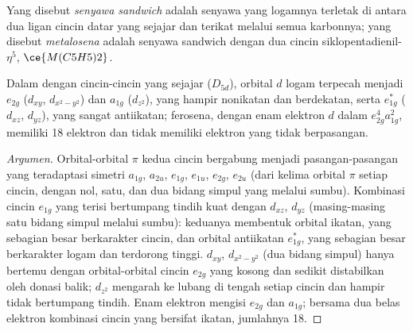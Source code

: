 \begin{definition}[Metalosena]\label{def:b3:organometallic-bonding:metallocene}
Yang disebut \emph{senyawa sandwich} adalah senyawa yang logamnya
terletak di antara dua ligan cincin datar yang sejajar dan terikat melalui semua karbonnya; yang
disebut \emph{metalosena} adalah senyawa sandwich dengan dua cincin
siklopentadienil-$\eta^5$, $\ce{M(C5H5)2}$.
\end{definition}

\begin{proposition}\label{prop:b3:organometallic-bonding:ferrocene}
Dalam  dengan cincin-cincin yang sejajar ($D_{5d}$), orbital $d$ logam terpecah menjadi $e_{2g}$
($d_{xy}$, $d_{x^2-y^2}$) dan $a_{1g}$ ($d_{z^2}$), yang hampir nonikatan dan berdekatan, serta $e_{1g}^\ast$ ($d_{xz}$,
$d_{yz}$), yang sangat antiikatan; ferosena, dengan enam elektron $d$ dalam $e_{2g}^4a_{1g}^2$, memiliki 18
elektron dan tidak memiliki elektron yang tidak berpasangan.
\end{proposition}

\begin{proof}[Argumen]
Orbital-orbital $\pi$ kedua cincin bergabung menjadi pasangan-pasangan yang teradaptasi simetri $a_{1g}$, $a_{2u}$,
$e_{1g}$, $e_{1u}$, $e_{2g}$, $e_{2u}$ (dari kelima orbital $\pi$ setiap cincin, dengan nol, satu, dan dua
bidang simpul yang melalui sumbu). Kombinasi cincin $e_{1g}$ yang terisi bertumpang tindih
kuat dengan $d_{xz}$, $d_{yz}$ (masing-masing satu bidang simpul melalui sumbu): keduanya membentuk orbital
ikatan, yang sebagian besar berkarakter cincin, dan orbital antiikatan $e_{1g}^\ast$, yang sebagian besar berkarakter logam dan terdorong tinggi. $d_{xy}$, $d_{x^2-y^2}$
(dua bidang simpul) hanya bertemu dengan orbital-orbital cincin $e_{2g}$ yang kosong dan sedikit
distabilkan oleh donasi balik; $d_{z^2}$ mengarah ke lubang di tengah setiap cincin dan
hampir tidak bertumpang tindih. Enam elektron mengisi $e_{2g}$ dan $a_{1g}$; bersama dua belas elektron
kombinasi cincin yang bersifat ikatan, jumlahnya 18.
\end{proof}

